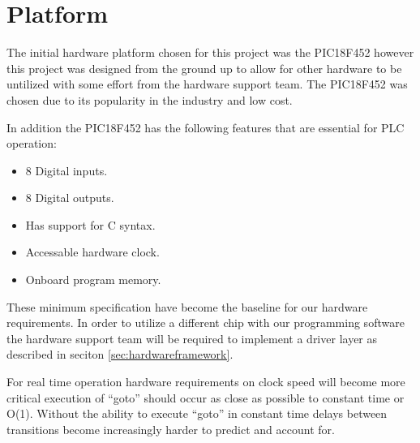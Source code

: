 \section{Platform}
\label{sec:hardwareplatform}

The initial hardware platform chosen for this project was the PIC18F452 however this project was designed from the ground up to allow for other hardware to be untilized with some effort from the hardware support team. The PIC18F452 was chosen due to its popularity in the industry and low cost.

In addition the PIC18F452 has the following features that are essential for PLC operation:

\begin{itemize}
\item 8 Digital inputs.
\item 8 Digital outputs.
\item Has support for C syntax.
\item Accessable hardware clock.
\item Onboard program memory.
\end{itemize}

These minimum specification have become the baseline for our hardware requirements. In order to utilize a different chip with our programming software the hardware support team will be required to implement a driver layer as described in seciton \ref{sec:hardwareframework}.

For real time operation hardware requirements on clock speed will become more critical execution of ``goto'' should occur as close as possible to constant time or O(1). Without the ability to execute ``goto'' in constant time delays between transitions become increasingly harder to predict and account for.